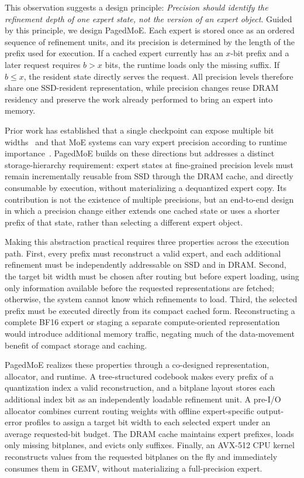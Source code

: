 \documentclass[sigconf, nonacm]{acmart}
\begin{document}
This observation suggests a design principle: \emph{Precision should identify the refinement depth of one expert state, not the version of an expert object}. Guided by this principle, we
design PagedMoE. Each expert is stored once as an ordered sequence of
refinement units, and its precision is determined by the
length of the prefix used for execution. If a cached expert currently
has an $x$-bit prefix and a later request requires $b>x$ bits, the
runtime loads only the missing suffix. If $b\leq x$, the resident
state directly serves the request. All precision levels therefore
share one SSD-resident representation, while precision changes reuse
DRAM residency and preserve the work already performed to bring an
expert into memory.

Prior work has established that a single checkpoint can expose
multiple bit widths~\cite{park2024anyprecision,nair2025matquant} and
that MoE systems can vary expert precision according to runtime
importance~\cite{hobbit,slicemoe,dymoe,d2moe}. 
PagedMoE builds on these directions but addresses a distinct
storage-hierarchy requirement: expert states at fine-grained precision levels must remain
incrementally reusable from SSD through the DRAM cache, and directly consumable by execution, without
materializing a dequantized expert copy.
Its contribution is not the existence of multiple precisions, but an
end-to-end design in which a precision change either extends one
cached state or uses a shorter prefix of that state, rather than
selecting a different expert object.

Making this abstraction practical requires three properties across the
execution path. First, every prefix must reconstruct a valid expert,
and each additional refinement must be independently addressable on
SSD and in DRAM. Second, the target bit width must be chosen after routing
but before expert loading, using only information available before the
requested representations are fetched; otherwise, the system cannot
know which refinements to load. Third, the selected prefix must be
executed directly from its compact cached form. Reconstructing a complete BF16 expert or staging a separate compute-oriented representation would introduce additional memory traffic,
negating much of the data-movement benefit of compact storage and
caching.

PagedMoE realizes these properties through a co-designed
representation, allocator, and runtime. A tree-structured codebook
makes every prefix of a quantization index a valid reconstruction, and
a bitplane layout stores each additional index bit as an independently
loadable refinement unit. A pre-I/O allocator combines current routing
weights with offline expert-specific output-error profiles to assign a
target bit width to each selected expert under an average requested-bit
budget. The DRAM cache maintains expert prefixes, loads only missing
bitplanes, and evicts only suffixes. Finally, an AVX-512 CPU kernel
reconstructs values from the requested bitplanes on the fly and
immediately consumes them in GEMV, without materializing a
full-precision expert.
\end{document}
